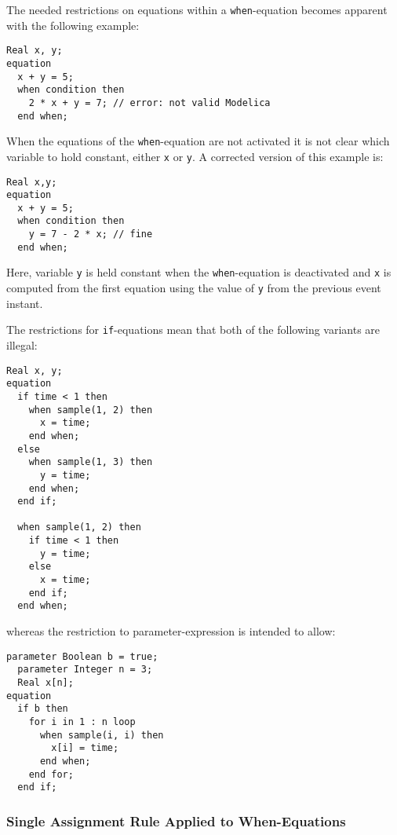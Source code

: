 \begin{nonnormative}
The needed restrictions on equations within a \lstinline!when!-equation becomes apparent with the following example:
\begin{lstlisting}[language=modelica]
  Real x, y;
equation
  x + y = 5;
  when condition then
    2 * x + y = 7; // error: not valid Modelica
  end when;
\end{lstlisting}

When the equations of the \lstinline!when!-equation are not activated it is not clear which variable to hold constant, either \lstinline!x! or \lstinline!y!.
A corrected version of this example is:
\begin{lstlisting}[language=modelica]
  Real x,y;
equation
  x + y = 5;
  when condition then
    y = 7 - 2 * x; // fine
  end when;
\end{lstlisting}
Here, variable \lstinline!y! is held constant when the \lstinline!when!-equation is deactivated and \lstinline!x! is computed from the first equation using the value of \lstinline!y! from the previous event instant.
\end{nonnormative}

\begin{example}
The restrictions for \lstinline!if!-equations mean that both of the following variants are illegal:
\begin{lstlisting}[language=modelica]
  Real x, y;
equation
  if time < 1 then
    when sample(1, 2) then
      x = time;
    end when;
  else
    when sample(1, 3) then
      y = time;
    end when;
  end if;

  when sample(1, 2) then
    if time < 1 then
      y = time;
    else
      x = time;
    end if;
  end when;
\end{lstlisting}
whereas the restriction to parameter-expression is intended to allow:
\begin{lstlisting}[language=modelica]
  parameter Boolean b = true;
  parameter Integer n = 3;
  Real x[n];
equation
  if b then
    for i in 1 : n loop
      when sample(i, i) then
        x[i] = time;
      end when;
    end for;
  end if;
\end{lstlisting}
\end{example}

\subsubsection{Single Assignment Rule Applied to When-Equations}\label{application-of-the-single-assignment-rule-to-when-equations}\label{single-assignment-rule-applied-to-when-equations}

